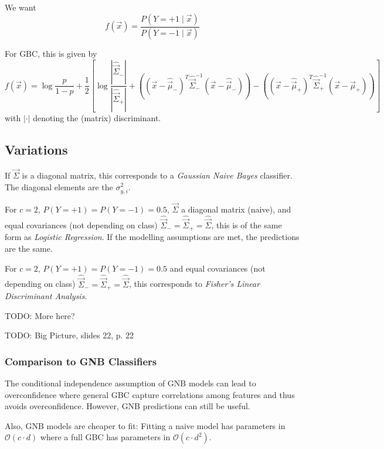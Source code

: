 We want
\begin{equation*}
    f(\vec{x}) = \frac{
        P(Y = +1 \mid \vec{x})
    }{
        P(Y = -1 \mid \vec{x})
    }
\end{equation*}

For GBC, this is given by
\begin{equation*}
    f(\vec{x}) =
    \log{\frac{p}{1-p}} +
    \frac{1}{2} \left[
        \log{\frac{|\hat{\vec{\Sigma}}_-|}{|\hat{\vec{\Sigma}}_+|}}
        +
        \left(
        (\vec{x}-\hat{\vec{\mu}}_-)^T
        \hat{\vec{\Sigma}}_-^{-1}
        (\vec{x}-\hat{\vec{\mu}}_-)
        \right)
        -
        \left(
        (\vec{x}-\hat{\vec{\mu}}_+)^T
        \hat{\vec{\Sigma}}_+^{-1}
        (\vec{x}-\hat{\vec{\mu}}_+)
        \right)
    \right]
\end{equation*}
with $|\cdot|$ denoting the (matrix)
discriminant.


\subsection{Variations}
If $\vec{\Sigma}$ is a diagonal matrix,
this corresponds to a
\emph{Gaussian Naive Bayes} classifier.
The diagonal elements are the
$\sigma^2_{y, i}$.

For $c = 2$, $P(Y = +1) = P(Y = -1) = 0.5$,
$\vec{\Sigma}$ a diagonal matrix (naive),
and equal covariances (not depending on class)
$\hat{\vec{\Sigma}}_- = \hat{\vec{\Sigma}}_+ = \hat{\vec{\Sigma}}$,
this is of the same form as \emph{Logistic Regression}.
If the modelling assumptions are met,
the predictions are the same.

For $c = 2$, $P(Y = +1) = P(Y = -1) = 0.5$
and equal covariances (not depending on class)
$\hat{\vec{\Sigma}}_- = \hat{\vec{\Sigma}}_+ = \hat{\vec{\Sigma}}$,
this corresponds to
\emph{Fisher's Linear Discriminant Analysis}.

TODO: More here?

TODO: Big Picture, slides 22, p. 22

\subsubsection{Comparison to GNB Classifiers}
The conditional independence assumption of
GNB models can lead to overconfidence
where general GBC capture correlations
among features and thus avoids overconfidence.
However, GNB predictions can still be useful.

Also, GNB models are cheaper to fit:
Fitting a naive model has parameters
in $\mathcal{O}(c \cdot d)$
where a full GBC has parameters
in $\mathcal{O}(c \cdot d^2)$.
